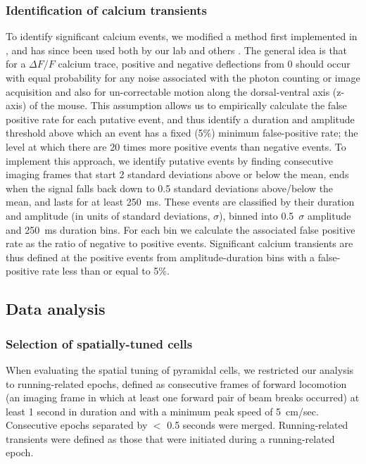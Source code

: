 \subsubsection{Identification of calcium transients}
To identify significant calcium events, we modified a method first implemented in \citealt{Dombeck2007}, and has since been used both by our lab \citep{Danielson2016a, Danielson2016b, Lovett-Barron2014} and others \citep{Dombeck2010, Rajasethupathy2015}. The general idea is that for a $\Delta F/F$ calcium trace, positive and negative deflections from 0 should occur with equal probability for any noise associated with the photon counting or image acquisition and also for un-correctable motion along the dorsal-ventral axis (z-axis) of the mouse. This assumption allows us to empirically calculate the false positive rate for each putative event, and thus identify a duration and amplitude threshold above which an event has a fixed (5\%) minimum false-positive rate; the level at which there are 20 times more positive events than negative events. To implement this approach, we identify putative events by finding consecutive imaging frames that start 2 standard deviations above or below the mean, ends when the signal falls back down to 0.5 standard deviations above/below the mean, and lasts for at least 250~ms. These events are classified by their duration and amplitude (in units of standard deviations, $\sigma$), binned into 0.5~$\sigma$ amplitude and 250~ms duration bins. For each bin we calculate the associated false positive rate as the ratio of negative to positive events. Significant calcium transients are thus defined at the positive events from amplitude-duration bins with a false-positive rate less than or equal to 5\%.

\subsection{Data analysis}
\subsubsection{Selection of spatially-tuned cells}\label{sec:df:methods:pc_identification}
When evaluating the spatial tuning of pyramidal cells, we restricted our analysis to running-related epochs, defined as consecutive frames of forward locomotion (an imaging frame in which at least one forward pair of beam breaks occurred) at least 1 second in duration and with a minimum peak speed of 5~cm/sec. Consecutive epochs separated by $<$ 0.5 seconds were merged. Running-related transients were defined as those that were initiated during a running-related epoch.


